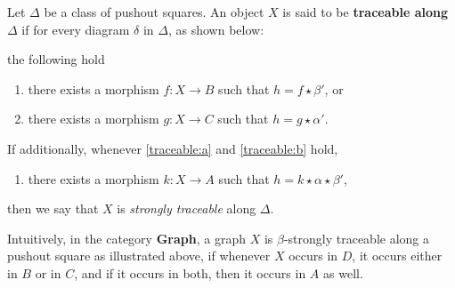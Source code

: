 \begin{definition}
    \label{def:traceability}
Let $\Delta$ be a class of pushout squares. 
An object $X$ is said to be \textbf{traceable along $\Delta$} if for every diagram $\delta$ in $\Delta$, as shown below:
\begin{center}
\end{center}
 the following hold
    \begin{enumerate}[label=(\alph*)]
        \item\label{traceable:a} there exists a morphism $f : X \to B$ such that $h = f \star \beta'$, or
        \item\label{traceable:b} there exists a morphism $g : X \to C$ such that $h = g \star \alpha'$.
    \end{enumerate}
    If additionally, 
    whenever \ref{traceable:a} and \ref {traceable:b} hold,
    \begin{enumerate}[label=(\alph*),resume]
        \item 
        there exists a morphism $k : X \to A$ such that $h = k \star \alpha \star \beta' $,
    \end{enumerate}
    then we say that $X$ is \emph{strongly traceable} along $\Delta$.
\end{definition}
Intuitively, in the category \textbf{Graph}, a graph $X$ is $\beta$-strongly traceable along a pushout square as illustrated above, if whenever $X$ occurs in $D$, it occurs either in $B$ or in $C$, and if it occurs in both, then it occurs in $A$ as well.

